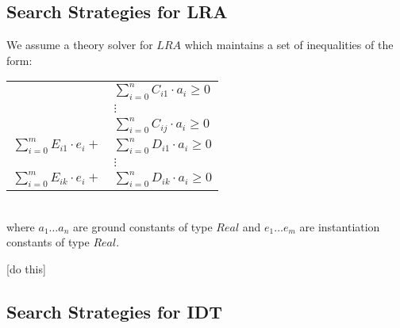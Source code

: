 \documentclass{llncs}
\begin{document}
\begin{comment}
\noindent Process: \\

$M \parallel E \parallel P, e = s \Longrightarrow M, R( E, e, s ) \parallel E, e = s \parallel P$, if   
$\begin{cases}
  \text{ No term in $E$ contains} \\
  \text{ \ \ \ $e$ as a subchild,} \\
  M \not\models \neg R( E, e, s ). \\
\end{cases}$ \\

$M \parallel E \parallel P, f( \bar{t} ) = f( \bar{s} ) \Longrightarrow M \parallel E \parallel P, \bar{t} = \bar{s}$, if   
$\begin{cases}
  \text{ No term in $E$ contains} \\
  \text{ \ \ \ $f( \bar{t} )$ as a subchild.} \\
\end{cases}$ \\
\end{comment}

\subsection{Search Strategies for LRA}

We assume a theory solver for $LRA$ which maintains a set of inequalities of the form:

\begin{tabular}{rl}
 & $\displaystyle\sum\limits_{i=0}^n C_{i1} \cdot a_i \geq 0$ \\
 & $\vdots$ \\
 & $\displaystyle\sum\limits_{i=0}^n C_{ij} \cdot a_i \geq 0$ \\
 $\displaystyle\sum\limits_{i=0}^m E_{i1} \cdot e_i +$ & $\displaystyle\sum\limits_{i=0}^n D_{i1} \cdot a_i \geq 0$ \\
 & $\vdots$ \\
 $\displaystyle\sum\limits_{i=0}^m E_{ik} \cdot e_i +$ & $\displaystyle\sum\limits_{i=0}^n D_{ik} \cdot a_i \geq 0$ \\
 \end{tabular} \\

where $a_1 \ldots a_n$ are ground constants of type $Real$ and $e_1 \ldots e_m$ are instantiation constants of type $Real$.

[do this]

\subsection{Search Strategies for IDT}
\end{document}
